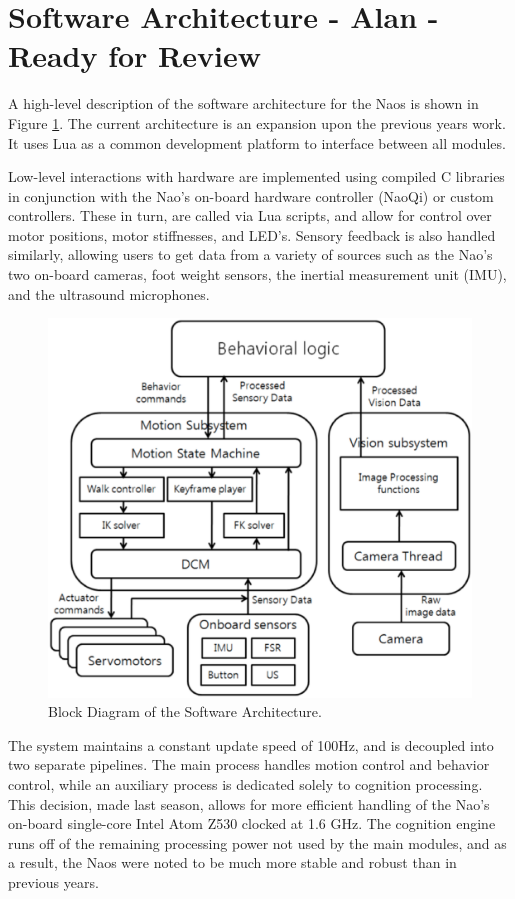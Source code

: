 \documentclass{article}
\begin{document}
\section{Software Architecture - Alan - Ready for Review}
	A high-level description of the software architecture for the Naos is shown in Figure \ref{fig:softarch}. The current architecture is an expansion upon the previous years work. It uses Lua as a common development platform to interface between all modules.

	Low-level interactions with hardware are implemented using compiled C libraries in conjunction with the Nao's on-board hardware controller (NaoQi) or custom controllers. These in turn, are called via Lua scripts, and allow for control over motor positions, motor stiffnesses, and LED's. Sensory feedback is also handled similarly, allowing users to get data from a variety of sources such as the Nao's two on-board cameras, foot weight sensors, the inertial measurement unit (IMU), and the ultrasound microphones.
	\begin{figure}[H]
		\centering
		\includegraphics[width=.9\textwidth]{figures/SoftArchOverview.eps}
		\caption{Block Diagram of the Software Architecture.}
		\label{fig:softarch}
	\end{figure}

	The system maintains a constant update speed of 100Hz, and is decoupled into two separate pipelines. The main process handles motion control and behavior control, while an auxiliary process is dedicated solely to cognition processing. This decision, made last season, allows for more efficient handling of the Nao's on-board single-core Intel Atom Z530 clocked at 1.6 GHz. The cognition engine runs off of the remaining processing power not used by the main modules, and as a result, the Naos were noted to be much more stable and robust than in previous years.
\end{document}
